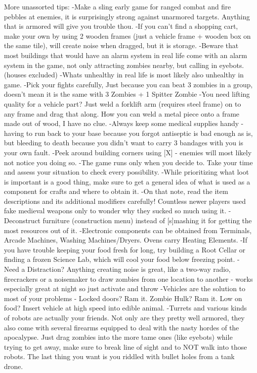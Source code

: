 \documentclass[11pt]{report}
\begin{document}
More unassorted tips:
-Make a sling early game for ranged combat and fire pebbles at enemies, it is surprisingly strong against unarmored targets. Anything that is armored will give you trouble thou.
-If you can't find a shopping cart, make your own by using 2 wooden frames (just a vehicle frame + wooden box on the same tile), will create noise when dragged, but it is storage.
-Beware that most buildings that would have an alarm system in real life come with an alarm system in the game, not only attracting zombies nearby, but calling in eyebots. (houses excluded)
-Whats unhealthy in real life is most likely also unhealthy in game.
-Pick your fights carefully, Just because you can beat 3 zombies in a group, doesn't mean it is the same with 3 Zombies + 1 Spitter Zombie
-You need lifting quality for a vehicle part? Just weld a forklift arm (requires steel frame) on to any frame and drag that along. How you can weld a metal piece onto a frame made out of wood, I have no clue.
-Always keep some medical supplies handy - having to run back to your base because you forgot antiseptic is bad enough as is, but bleeding to death because you didn't want to carry 3 bandages with you is your own fault.
-Peek around building corners using [X] - enemies will most likely not notice you doing so.
-The game runs only when you decide to. Take your time and assess your situation to check every possibility.
-While prioritizing what loot is important is a good thing, make sure to get a general idea of what is used as a component for crafts and where to obtain it.
-On that note, read the item descriptions and its additional modifiers carefully! Countless newer players used fake medieval weapons only to wonder why they sucked so much using it.
-Deconstruct furniture (construction menu) instead of [s]mashing it for getting the most resources out of it.
-Electronic components can be obtained from Terminals, Arcade Machines, Washing Machines/Dryers. Ovens carry Heating Elements.
-If you have trouble keeping your food fresh for long, try building a Root Cellar or finding a frozen Science Lab, which will cool your food below freezing point.
-Need a Distraction? Anything creating noise is great, like a two-way radio, firecrackers or a noisemaker to draw zombies from one location to another - works especially great at night so just activate and throw
-Vehicles are the solution to most of your problems - Locked doors? Ram it. Zombie Hulk? Ram it. Low on food? Insert vehicle at high speed into edible animal.
-Turrets and various kinds of robots are actually your friends. Not only are they pretty well armored, they also come with several firearms equipped to deal with the nasty hordes of the apocalypse. Just drag zombies into the more tame ones (like eyebots) while trying to get away, make sure to break line of sight and to NOT walk into those robots. The last thing you want is you riddled with bullet holes from a tank drone.
\end{document}
